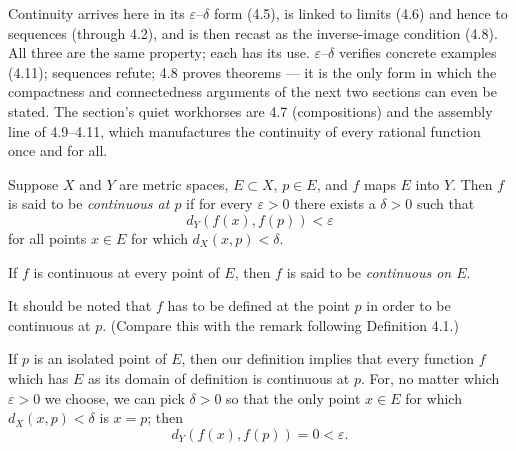 
\begin{signpost}
Continuity arrives here in its $\varepsilon$--$\delta$ form (4.5), is linked
to limits (4.6) and hence to sequences (through 4.2), and is then recast as
the inverse-image condition (4.8). All three are the same property; each has
its use. $\varepsilon$--$\delta$ verifies concrete examples (4.11);
sequences refute; 4.8 proves theorems --- it is the only form in which the
compactness and connectedness arguments of the next two sections can even be
stated. The section's quiet workhorses are 4.7 (compositions) and the
assembly line of 4.9--4.11, which manufactures the continuity of every
rational function once and for all.
\end{signpost}

Suppose $X$ and $Y$ are metric spaces, $E \subset X$, $p \in E$, and $f$ maps
$E$ into $Y$. Then $f$ is said to be \emph{continuous at $p$} if for every
$\varepsilon > 0$ there exists a $\delta > 0$ such that
\[ d_Y(f(x),f(p)) < \varepsilon \]
for all points $x \in E$ for which $d_X(x,p) < \delta$.

If $f$ is continuous at every point of $E$, then $f$ is said to be
\emph{continuous on $E$}.

It should be noted that $f$ has to be defined at the point $p$ in order to be
continuous at $p$. (Compare this with the remark following Definition
4.1.)

If $p$ is an isolated point of $E$, then our definition implies that every
function $f$ which has $E$ as its domain of definition is continuous at $p$.
For, no matter which $\varepsilon > 0$ we choose, we can pick $\delta > 0$ so
that the only point $x \in E$ for which $d_X(x,p) < \delta$ is $x = p$; then
\[ d_Y(f(x),f(p)) = 0 < \varepsilon. \]


